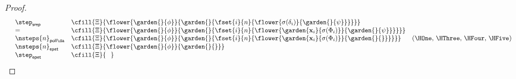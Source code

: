 \begin{proof}
$$\begin{array}{rlll}
    &\step_{\mathsf{srep}} &\cfill{\Xi}{\flower{\garden{{}}{\phi}}{\garden{{}}{\fset{i}{n}{\flower{\sigma(\delta_i)}{\garden{{}}{\psi}}}}}} & \\
    &= &\cfill{\Xi}{\flower{\garden{{}}{\phi}}{\garden{{}}{\fset{i}{n}{\flower{\garden{\mathbf{x}_i}{\sigma(\Phi_i)}}{\garden{{}}{\psi}}}}}} & \\
    &\nsteps{n}_{\mathsf{poll}{\da}} &\cfill{\Xi}{\flower{\garden{{}}{\phi}}{\garden{{}}{\fset{i}{n}{\flower{\garden{\mathbf{x}_i}{\sigma(\Phi_i)}}{\garden{{}}{{}}}}}}} &\text{(\HOne, \HThree, \HFour, \HFive)} \\
    &\nsteps{n}_{\mathsf{epet}} &\cfill{\Xi}{\flower{\garden{{}}{\phi}}{\garden{{}}{{}}}} & \\
    &\step_{\mathsf{epet}} &\cfill{\Xi}{\phantom{\Phi}} &
  \end{array}
  $$
\end{proof}

